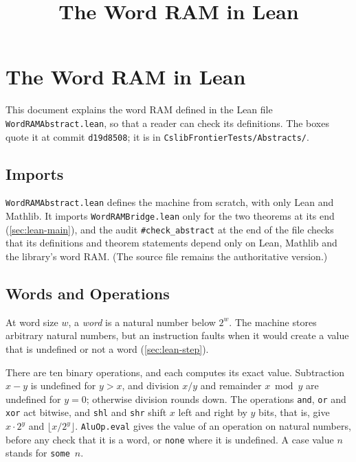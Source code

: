 \documentclass[11pt]{article}
\title{The Word RAM in Lean}
\author{}
\date{}
\newcommand{\leanitem}[1]{\leansep\def\leansep{\vspace{2pt}}}
\newcommand{\leansnippet}[1]{\begin{leanbox}\def\leansep{}\let\do\leanitem\docsvlist{#1}\end{leanbox}}
\newcommand{\lean}[1]{\texttt{#1}}
\newcommand{\file}[1]{\texttt{#1}}
\begin{document}
\maketitle

\section{The Word RAM in Lean}\label{sec:lean}

This document explains the word RAM defined in the Lean file \file{WordRAMAbstract.lean}, so
that a reader can check its definitions.
The boxes quote it at commit \texttt{d19d8508}; it is in \file{CslibFrontierTests/Abstracts/}.

\subsection{Imports}

\file{WordRAMAbstract.lean} defines the machine from scratch, with only Lean and Mathlib.
It imports \file{WordRAMBridge.lean} only for the two theorems at its end
(\cref{sec:lean-main}), and the audit \lean{\#check\_abstract} at the end of the file checks
that its definitions and theorem statements depend only on Lean, Mathlib and the library's word
RAM.
(The source file remains the authoritative version.)

\leansnippet{Imports}

\subsection{Words and Operations}

At word size $w$, a \emph{word} is a natural number below $2^w$.
The machine stores arbitrary natural numbers, but an instruction faults when it would
create a value that is undefined or not a word (\cref{sec:lean-step}).

There are ten binary operations, and each computes its exact value.
Subtraction $x-y$ is undefined for $y>x$, and division $x/y$ and remainder $x \bmod y$ are
undefined for $y=0$; otherwise division rounds down.
The operations \lean{and}, \lean{or} and \lean{xor} act bitwise,
and \lean{shl} and \lean{shr} shift $x$ left and right by $y$ bits,
that is, give $x\cdot 2^y$ and $\lfloor x/2^y\rfloor$.
\lean{AluOp.eval} gives the value of an operation on natural numbers, before any check that
it is a word, or \lean{none} where it is undefined.
A case value $n$ stands for \lean{some}~$n$.

\leansnippet{AluOp,AluOp.eval}
\end{document}

